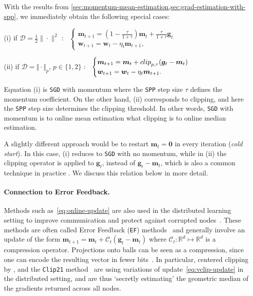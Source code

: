 \documentclass[10pt]{article} %
\renewcommand{\vec}[1]{\bm{#1}}
\newcommand{\bw}{\bm{w}}
\newcommand{\m}{\bm{m}}
\newcommand{\R}{\mathbb{R}}
\newcommand{\dist}{\mathcal{D}}
\newcommand{\SGD}{\texttt{SGD}}
\newcommand{\SPP}{\texttt{SPP}}
\begin{document}
With the results from \cref{sec:momentum-mean-estimation,sec:grad-estimation-with-spp}, we immediately obtain the following special cases: 

(i) \quad if $\dist = \frac{1}{2}\|\cdot\|^2$ : \
     $\begin{cases}
         \vec{m}_{t+1}  =  (1-\tfrac{\tau}{1+\tau}) \vec{m}_t + \tfrac{\tau}{1+\tau} \vec{g}_t \\
         \bw_{t+1}  = \bw_t - \eta_t \m_{t+1},
     \end{cases}$
     
(ii) \quad if $\dist = \Vert \cdot \Vert_p$, $p \in \{1,2 \}$  :   \
     $\begin{cases}
         \vec{m}_{t+1} = \vec{m}_t + {\rm clip}_{p,\tau}(\vec{g}_t - \vec{m}_t) \\
         \bw_{t+1}  = \bw_t - \eta_t \m_{t+1}.
     \end{cases} $ 

Equation (i) is \SGD{} with momentum where the \SPP{} step size $\tau$ defines the momentum coefficient.
On the other hand, (ii) corresponds to clipping, and here the \SPP{} step size determines the clipping threshold.
In other words, \SGD{} with momentum is to online mean estimation what clipping is to online median estimation.

A slightly different approach would be to restart $\m_t=\vec{0}$ in every iteration (\emph{cold start}). 
In this case, (i) reduces to \SGD{} with no momentum, while in (ii) the clipping operator is applied to $\vec{g}_t$, instead of $\vec{g}_t-\vec{m}_t$, which is also a common technique in practice \citep{Zhang2020}. We discuss this relation below in more detail.

\paragraph{Connection to Error Feedback.}
Methods such as~\eqref{eq:online-update} are also used in the distributed learning setting to improve communication and protect against corrupted nodes~\citep{Karimireddy2021}. These methods are often called  Error Feedback (\texttt{EF}) methods~\citep{seide2014-bit,richtarik2021ef}
and generally involve an update of the form
$\vec{m}_{t+1} = \vec{m}_t + \mathcal{C}_t (\vec{g}_t-\vec{m}_t)$
where $\mathcal{C}_t :\R^d \mapsto \R^d$ is a compression operator.
Projections onto balls can be seen as a compression, since one can encode the resulting vector in fewer bits~\citep{Safaryan2021}.
In particular, centered clipping by \citet{Karimireddy2021}, and the \texttt{Clip21} method~\citep{khirirat2023clip21} are using variations of update~\eqref{eq:vclip-update} in the distributed setting, and are thus `secretly estimating' the geometric median of the gradients returned across all nodes.
\end{document}
